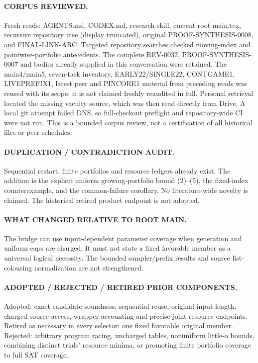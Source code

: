 \documentclass[11pt]{article}
\begin{document}
\paragraph{CORPUS REVIEWED.}
Fresh reads: AGENTS.md, CODEX.md, research skill, current root main.tex,
recursive repository tree (display truncated), original
PROOF-SYNTHESIS-0008, and FINAL-LINK-ARC. Targeted repository searches checked
moving-index and pointwise-portfolio antecedents. The complete REV-0032,
PROOF-SYNTHESIS-0007 and  bodies already supplied
in this conversation were retained. The main4/main5, seven-task inventory,
EARLY22/SINGLE22, CONTGAME1, LIVEPREFIX1, latest peer and PINCORE1 material
from preceding reads was reused with its scope; it is not claimed freshly
reaudited in full. Personal retrieval located the missing vacuity source,
which was then read directly from Drive. A local git attempt failed DNS, so
full-checkout preflight and repository-wide CI were not run. This is a bounded
corpus review, not a certification of all historical files or peer schedules.

\paragraph{DUPLICATION / CONTRADICTION AUDIT.}
Sequential restart, finite portfolios and resource ledgers already exist.
The addition is the explicit uniform growing-portfolio bound (2)--(5), the
fixed-index counterexample, and the common-failure corollary. No literature-wide
novelty is claimed. The historical retired product endpoint is not adopted.

\paragraph{WHAT CHANGED RELATIVE TO ROOT MAIN.}
The bridge can use input-dependent parameter coverage when generation and
uniform caps are charged. It must not state a fixed favorable member as a
universal logical necessity. The bounded sampler/prefix results and source
list-colouring normalization are not strengthened.

\paragraph{ADOPTED / REJECTED / RETIRED PRIOR COMPONENTS.}
Adopted: exact candidate soundness, sequential reuse, original input length,
charged source access, wrapper accounting and precise joint-resource endpoints.
Retired as necessary in every selector: one fixed favorable original member.
Rejected: arbitrary program racing, uncharged tables, nonuniform little-o
bounds, combining distinct trials' resource minima, or promoting finite
portfolio coverage to full SAT coverage.
\end{document}
